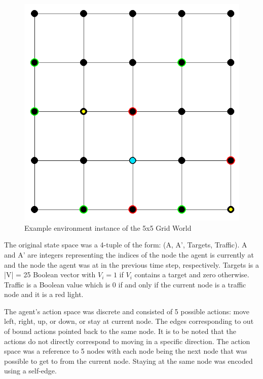 \documentclass{article}
\begin{document}
	\begin{figure}[hbt!]
		\label{grid_world}
		\centering
		\includegraphics[scale=0.4]{grid-world.png}
		\caption{Example environment instance of the 5x5 Grid World}
		\label{fig:grid-world.png}
	\end{figure}
	\FloatBarrier 
	
	The original state space was a 4-tuple of the form: (A, A', Targets, Traffic). A and A' are integers representing the indices of the node the agent is currently at and the node the agent was at in the previous time step, respectively. Targets is a |V| = 25 Boolean vector with $V_{i}=1$ if $V_i$ contains a target and zero otherwise. Traffic is a Boolean value which is 0 if and only if the current node is a traffic node and it is a red light.
	
	The agent's action space was discrete and consisted of 5 possible actions: move left, right, up, or down, or stay at current node. The edges corresponding to out of bound actions pointed back to the same node. It is to be noted that the actions do not directly correspond to moving in a specific direction. The action space was a reference to 5 nodes with each node being the next node that was possible to get to from the current node. Staying at the same node was encoded using a self-edge.
	
\end{document}

